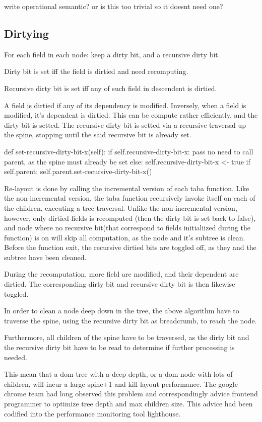 \documentclass[format=acmsmall, review=false, screen=true]{acmart}
\begin{document}
write operational semantic? or is this too trivial so it doesnt need one?

\subsection{Dirtying}

For each field in each node: keep a dirty bit, and a recursive dirty bit.

Dirty bit is set iff the field is dirtied and need recomputing.

Recursive dirty bit is set iff any of such field in descendent is dirtied.

A field is dirtied if any of its dependency is modified. Inversely, when a field is modified, it's dependent is dirtied. This can be compute rather efficiently, and the dirty bit is setted. The recursive dirty bit is setted via a recursive traversal up the spine, stopping until the said recursive bit is already set.

def set-recursive-dirty-bit-x(self):
if self.recursive-dirty-bit-x:
pass no need to call parent, as the spine must already be set
else:
self.recursive-dirty-bit-x <- true
if self.parent:
self.parent.set-recursive-dirty-bit-x()

Re-layout is done by calling the incremental version of each taba function. Like the non-incremental version, the taba function recursively invoke itself on each of the children, executing a tree-traversal. Unlike the non-incremental version, however, only dirtied fields is recomputed (then the dirty bit is set back to false), and node where no recursive bit(that correspond to fields initialiized during the function) is on will skip all computation, as the node and it's subtree is clean. Before the function exit, the recursive dirtied bits are toggled off, as they and the subtree have been cleaned.

During the recomputation, more field are modified, and their dependent are dirtied. The corresponding dirty bit and recursive dirty bit is then likewise toggled.

In order to clean a node deep down in the tree, the above algorithm have to traverse the spine, using the recursive dirty bit as breadcrumb, to reach the node.

Furthermore, all children of the spine have to be traversed, as the dirty bit and the recursive dirty bit have to be read to determine if further processing is needed.

This mean that a dom tree with a deep depth, or a dom node with lots of children, will incur a large spine+1 and kill layout performance. The google chrome team had long observed this problem and correspondingly advice frontend programmer to optimize tree depth and max children size. This advice had been codified into the performance monitoring tool lighthouse.
\end{document}
